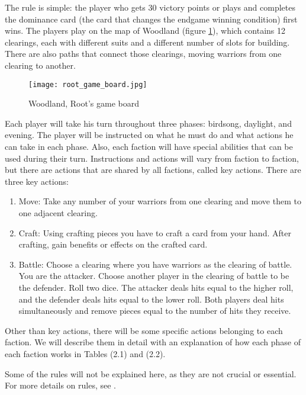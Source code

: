 The rule is simple: the player who gets 30 victory points or plays and completes the dominance card (the card that changes the endgame winning condition) first wins. The players play on the map of Woodland (figure \ref{fig:root-game-board}), which contains 12 clearings, each with different suits and a different number of slots for building. There are also paths that connect those clearings, moving warriors from one clearing to another.

\begin{figure}
  \begin{center}
    \texttt{[image: root\_game\_board.jpg]}
  \end{center}
  \caption{Woodland, Root's game board}
  \label{fig:root-game-board}
\end{figure}

Each player will take his turn throughout three phases: birdsong, daylight, and evening. The player will be instructed on what he must do and what actions he can take in each phase. Also, each faction will have special abilities that can be used during their turn. Instructions and actions will vary from faction to faction, but there are actions that are shared by all factions, called key actions. There are three key actions:

\begin{enumerate}
  \item Move: Take any number of your warriors from one clearing and move them to one adjacent clearing.
  \item Craft: Using crafting pieces you have to craft a card from your hand. After crafting, gain benefits or effects on the crafted card.
  \item Battle: Choose a clearing where you have warriors as the clearing of battle. You are the attacker. Choose another player in the clearing of battle to be the defender. Roll two dice. The attacker deals hits equal to the higher roll, and the defender deals hits equal to the lower roll. Both players deal hits simultaneously and remove pieces equal to the number of hits they receive.
\end{enumerate}

Other than key actions, there will be some specific actions belonging to each faction. We will describe them in detail with an explanation of how each phase of each faction works in Tables (2.1) and (2.2).

Some of the rules will not be explained here, as they are not crucial or essential. For more details on rules, see \cite{RootBoardGameRules}.

